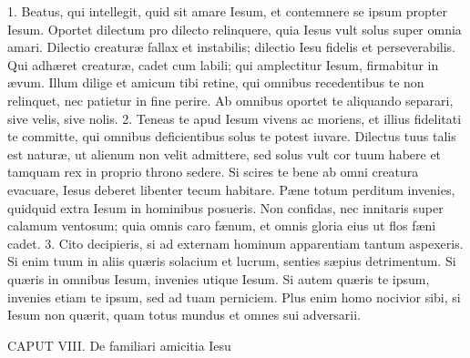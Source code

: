 \documentclass[twoside]{article}
\begin{document}
1. Beatus, qui intellegit, quid sit amare Iesum, et contemnere se ipsum propter Iesum. Oportet dilectum pro dilecto relinquere, quia Iesus vult solus super omnia amari. Dilectio creaturæ fallax et instabilis; dilectio Iesu fidelis et perseverabilis. Qui adhæret creaturæ, cadet cum labili; qui amplectitur Iesum, firmabitur in ævum. Illum dilige et amicum tibi retine, qui omnibus recedentibus te non relinquet, nec patietur in fine perire. Ab omnibus oportet te aliquando separari, sive velis, sive nolis.
2. Teneas te apud Iesum vivens ac moriens, et illius fidelitati te committe, qui omnibus deficientibus solus te potest iuvare. Dilectus tuus talis est naturæ, ut alienum non velit admittere, sed solus vult cor tuum habere et tamquam rex in proprio throno sedere. Si scires te bene ab omni creatura evacuare, Iesus deberet libenter tecum habitare. Pæne totum perditum invenies, quidquid extra Iesum in hominibus posueris. Non confidas, nec innitaris super calamum ventosum; quia omnis caro fænum, et omnis gloria eius ut flos fæni cadet.
3. Cito decipieris, si ad externam hominum apparentiam tantum aspexeris. Si enim tuum in aliis quæris solacium et lucrum, senties sæpius detrimentum. Si quæris in omnibus Iesum, invenies utique Iesum. Si autem quæris te ipsum, invenies etiam te ipsum, sed ad tuam perniciem. Plus enim homo nocivior sibi, si Iesum non quærit, quam totus mundus et omnes sui adversarii.


CAPUT VIII.
De familiari amicitia Iesu
\end{document}
